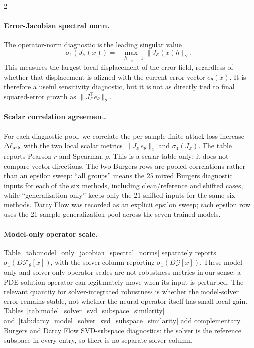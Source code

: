 \documentclass[letterpaper]{article} %
\newcommand{\tabref}[1]{Table~\ref{#1}}
\begin{document}
\begin{multicols}{2}
\paragraph{Error-Jacobian spectral norm.}
The operator-norm diagnostic is the leading singular value
\[
  \sigma_1(J_{\mathcal E}(x))
  =
  \max_{\|h\|_2=1}\|J_{\mathcal E}(x)h\|_2 .
\]
This measures the largest local displacement of the error field, regardless of
whether that displacement is aligned with the current error vector
\(e_\theta(x)\).  It is therefore a useful sensitivity diagnostic, but it is not
as directly tied to final squared-error growth as
\(\|J_{\mathcal E}^{\top}e_\theta\|_2\).

\paragraph{Scalar correlation agreement.}
For each diagnostic pool, we correlate the per-sample finite attack loss
increase \(\Delta\ell_{\rm atk}\) with the two local scalar metrics
\(\|J_{\mathcal E}^{\top}e_\theta\|_2\) and
\(\sigma_1(J_{\mathcal E})\).  The table reports Pearson \(r\) and Spearman
\(\rho\).  This is a scalar table only; it does not compare vector directions.
The two Burgers rows are pooled correlations rather than an epsilon sweep:
``all groups'' means the 25 mixed Burgers diagnostic inputs for each of the six
methods, including clean/reference and shifted cases, while ``generalization
only'' keeps only the 21 shifted inputs for the same six methods.  Darcy Flow
was recorded as an explicit epsilon sweep; each epsilon row uses the 21-sample
generalization pool across the seven trained models.

\paragraph{Model-only operator scale.}
\tabref{tab:model_only_jacobian_spectral_norms} separately reports
\(\sigma_1(D\mathcal{F}_\theta[x])\), with the solver column reporting
\(\sigma_1(D\mathcal{G}[x])\).  These model-only and solver-only operator
scales are not robustness metrics in our sense: a PDE solution operator can
legitimately move when its input is perturbed.  The relevant quantity for
solver-integrated robustness is whether the model-solver error remains stable,
not whether the neural operator itself has small local gain.
Tables~\ref{tab:model_solver_svd_subspace_similarity}
and~\ref{tab:darcy_model_solver_svd_subspace_similarity} add complementary
Burgers and Darcy Flow SVD-subspace diagnostics: the solver is the reference
subspace in every entry, so there is no separate solver column.

\end{multicols}
\end{document}
